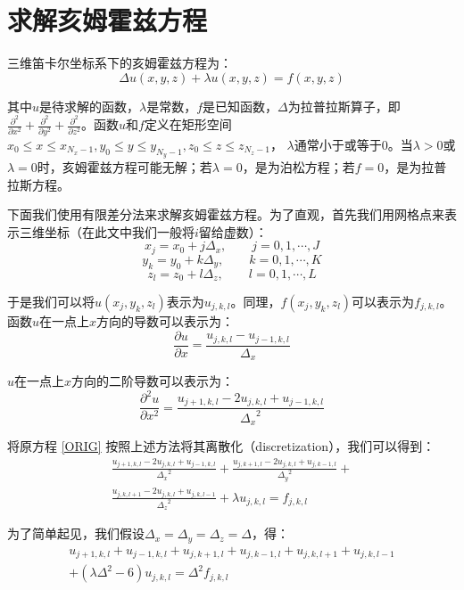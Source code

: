 \chapter{求解亥姆霍兹方程}
三维笛卡尔坐标系下的亥姆霍兹方程为：
\begin{equation}\label{ORIG}
\Delta u(x,y,z) + \lambda u(x,y,z) = f(x,y,z)
\end{equation}  

其中$u$是待求解的函数，$\lambda$是常数，$f$是已知函数，$\Delta$为拉普拉斯算子，即$\frac{\partial^2}{\partial x^2} + \frac{\partial^2}{\partial y^2}+\frac{\partial^2}{\partial z^2}$。函数$u$和$f$定义在矩形空间
$x_0 \leq x \leq x_{N_x-1}, y_0 \leq y \leq y_{N_y-1}, z_0 \leq z \leq z_{N_z-1}$，
$\lambda$通常小于或等于0。当$\lambda > 0$或$\lambda = 0$时，亥姆霍兹方程可能无解；若$\lambda = 0$，是为泊松方程；若$f =0 $，是为拉普拉斯方程。  

下面我们使用有限差分法来求解亥姆霍兹方程。为了直观，首先我们用网格点来表示三维坐标（在此文中我们一般将$i$留给虚数）：
$$x_j = x_0 + j\Delta_x, \qquad j = 0,1,\cdots,J$$
$$y_k = y_0 + k\Delta_y, \qquad k = 0,1,\cdots,K$$
$$z_l = z_0 + l\Delta_z, \qquad l = 0,1,\cdots,L$$  

于是我们可以将$u(x_j,y_k,z_l)$表示为$u_{j,k,l}$。同理，$f(x_j,y_k,z_l)$可以表示为$f_{j,k,l}$。  
函数$u$在一点上$x$方向的导数可以表示为：
$$
\frac{\partial u}{\partial x} = \frac{u_{j,k,l}-u_{j-1,k,l}}{\Delta_x}
$$  
  
$u$在一点上$x$方向的二阶导数可以表示为：
$$
\frac{\partial^2 u}{\partial x^2} = \frac{u_{j+1,k,l}-2u_{j,k,l}+u_{j-1,k,l}}{{\Delta_x}^2}
$$  

将原方程 \eqref{ORIG} 按照上述方法将其离散化（discretization），我们可以得到：
\begin{equation} \label{DISCRET}
\begin{split}
\frac{u_{j+1,k,l}-2u_{j,k,l}+u_{j-1,k,l}}{{\Delta_x}^2} +
\frac{u_{j,k+1,l}-2u_{j,k,l}+u_{j,k-1,l}}{{\Delta_y}^2} + \\
\frac{u_{j,k,l+1}-2u_{j,k,l}+u_{j,k,l-1}}{{\Delta_z}^2} + 
\lambda u_{j,k,l} = f_{j,k,l}
\end{split}
\end{equation}  

为了简单起见，我们假设$\Delta_x = \Delta_y = \Delta_z = \Delta$，得：
\begin{equation} \label{DISC}
\begin{split}
u_{j+1,k,l}+u_{j-1,k,l}+u_{j,k+1,l}+u_{j,k-1,l}+u_{j,k,l+1}+u_{j,k,l-1}\\
+(\lambda \Delta^2 - 6)u_{j,k,l} = \Delta^2 f_{j,k,l}
\end{split}
\end{equation}


